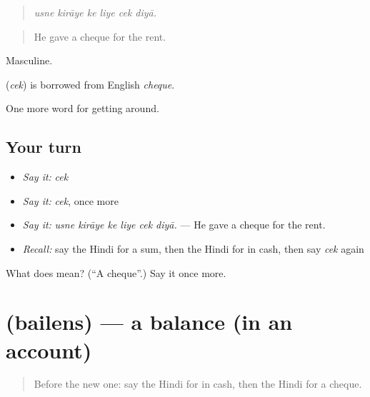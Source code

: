 \begin{quote}
     
\end{quote}

\begin{quote}
\emph{usne kirāye ke liye cek diyā.}
\end{quote}

\begin{quote}
He gave a cheque for the rent.
\end{quote}

Masculine.

\begin{cousinweb}
\textbf{} (\emph{cek}) is borrowed from English \emph{cheque}.
\end{cousinweb}

\begin{grammarlens}[title={What you've built}]
One more word for getting around.
\end{grammarlens}

\subsection*{Your turn}
\begin{itemize}
\raggedright
  \item \emph{Say it:} \emph{cek}
  \item \emph{Say it:} \emph{cek}, once more
  \item \emph{Say it:} \emph{usne kirāye ke liye cek diyā.} — He gave a cheque for the rent.
  \item \emph{Recall:} say the Hindi for a sum, then the Hindi for in cash, then say \emph{cek} again
\end{itemize}

\begin{tcolorbox}[breakable,colback=teal!4,colframe=teal!35!black,title={Before you move on}]
What does  mean? (\textquotedblleft{}A cheque\textquotedblright{}.) Say it once more.
\end{tcolorbox}
\section[\texorpdfstring{\hi{बैलेंस} (bailens)}{बैलेंस (bailens)}]{ (bailens) — a balance (in an account)}

\label{lesson:HI-C426-bailens}



\begin{quote}
Before the new one: say the Hindi for in cash, then the Hindi for a cheque.
\end{quote}

